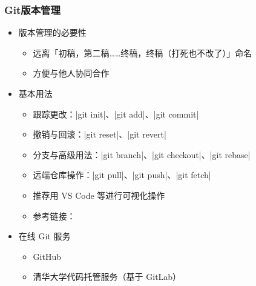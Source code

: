 \begin{frame}[fragile]
  \frametitle{Git版本管理}
  \begin{itemize}
    \item 版本管理的必要性
      \begin{itemize}
        \item 远离「初稿，第二稿……终稿，终稿（打死也不改了）」命名
        \item 方便与他人协同合作
      \end{itemize}
    \item 基本用法
      \begin{itemize}
        \item 跟踪更改：|git init|、|git add|、|git commit|
        \item 撤销与回滚：|git reset|、|git revert|
        \item 分支与高级用法：|git branch|、|git checkout|、|git rebase|
        \item 远端仓库操作：|git pull|、|git push|、|git fetch|
        \item 推荐用 VS Code 等进行可视化操作
        \item 参考链接：
      \end{itemize}
    \item 在线 Git 服务
      \begin{itemize}
        \item GitHub \href{https://github.com}{\faGithub}
        \item 清华大学代码托管服务（基于 GitLab） 
      \end{itemize}
  \end{itemize}
  \end{frame}

